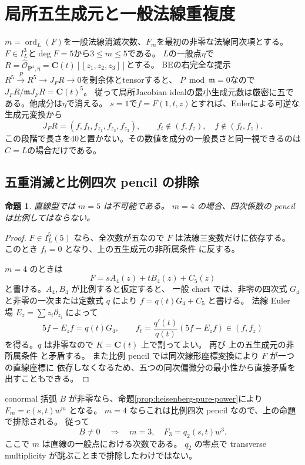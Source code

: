 \documentclass[11pt,a4paper]{ltjsarticle}
\newcommand{\CC}{\mathbf C}\newcommand{\QQ}{\mathbf Q}
\newcommand{\PP}{\mathbf P}\renewcommand{\AA}{\mathbf A}
\newtheorem{proposition}[theorem]{命題}
\theoremstyle{remark}\newtheorem{remark}[theorem]{注意}
\begin{document}
\section{局所五生成元と一般法線重複度}\label{sec:five-minimal}
$m=\operatorname{ord}_L(F)$を一般法線消滅次数、$F_m$を最初の非零な法線同次項とする。
$F\in I_L^3$と$\deg F=5$から$3\le m\le5$である。
$L$の一般点$\eta$で$R=\widehat{\mathcal O}_{\PP^4,\eta}=\CC(t)[[z_1,z_2,z_3]]$とする。
BEの右完全な提示$R^5\xrightarrow P R^5\to J_FR\to0$を剰余体とtensorすると、
$P\bmod\mathfrak m=0$なので$J_FR/\mathfrak mJ_FR=\CC(t)^5$。
従って局所Jacobian idealの最小生成元数は厳密に五である。他成分は$\eta$で消える。
$s=1$で$f=F(1,t,z)$とすれば、Eulerによる可逆な生成元変換から
\[
J_FR=(f,f_t,f_{z_1},f_{z_2},f_{z_3}),\qquad f_t\notin(f,f_z),\quad f\notin(f_t,f_z).
\]
この段階で長さを40と置かない。その数値を成分の一般長さと同一視できるのは$C=L$の場合だけである。


\subsection{五重消滅と比例四次 pencil の排除}

\begin{proposition}\label{prop:mult-exclusions}
直線型では $m=5$ は不可能である。
$m=4$ の場合、四次係数の pencil は比例してはならない。
\end{proposition}
\begin{proof}
$F\in I_L^5(5)$ なら、全次数が五なので $F$ は法線三変数だけに依存する。
このとき $f_t=0$ となり、上の五生成元の非所属条件 に反する。

$m=4$ のときは
\[
             F=sA_4(z)+tB_4(z)+C_5(z)
\]
と書ける。$A_4,B_4$ が比例すると仮定すると、
一般 chart では、非零の四次式 $G_4$ と非零の一次または定数式 $q$ により
$f=q(t)G_4+C_5$ と書ける。
法線 Euler 場 $E_z=\sum z_i\partial_{z_i}$ によって
\[
                    5f-E_zf=q(t)G_4,\qquad
 f_t=\frac{q'(t)}{q(t)}(5f-E_zf)\in(f,f_z)
\]
を得る。$q$ は非零なので $K=\CC(t)$ 上で割ってよい。
再び 上の五生成元の非所属条件 と矛盾する。
また比例 pencil では同次線形座標変換により $F$ が一つの直線座標に
依存しなくなるため、五つの同次偏微分の最小性から直接矛盾を出すこともできる。
\end{proof}

conormal 括弧 $B$ が非零なら、命題\ref{prop:heisenberg-pure-power}により
$F_m=c(s,t)w^m$ となる。
$m=4$ ならこれは比例四次 pencil なので、上の命題で排除される。
従って
\[
                  B\ne0\quad\Longrightarrow\quad
                  m=3,\quad F_3=q_2(s,t)w^3.
\]
ここで $m$ は直線の一般点における次数である。
$q_2$ の零点で transverse multiplicity が跳ぶことまで排除したわけではない。
\end{document}
